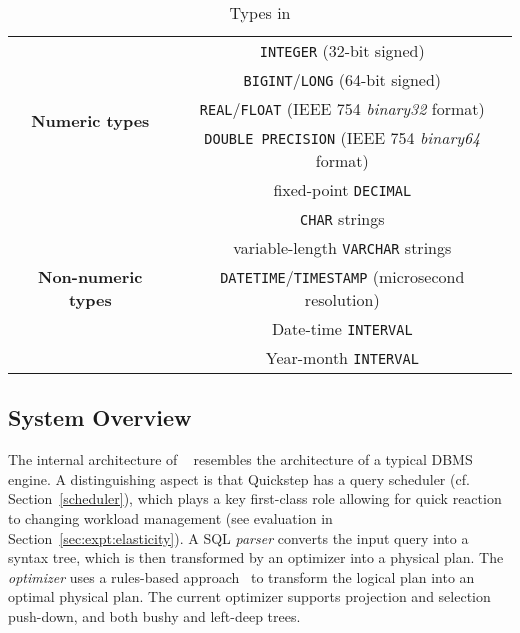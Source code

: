 \begin{table}[t]
	\centering
	\begin{tabular}{|c|c|} \hline
		\multirow{5}{*}{\textbf{Numeric types}} &  \small{\texttt{INTEGER} (32-bit signed)} \\ & \small{\texttt{BIGINT}/\texttt{LONG} (64-bit signed)} \\  & \small{\texttt{REAL}/\texttt{FLOAT} (IEEE 754 \textit{binary32} format)} \\ & \small{\texttt{DOUBLE PRECISION} (IEEE 754 \textit{binary64} format)} \\ & \small{fixed-point \texttt{DECIMAL}} \\ \hline
		\multirow{5}{*}{\textbf{Non-numeric types}} & \texttt{CHAR} strings \\ & variable-length  \texttt{VARCHAR} strings \\ & \texttt{DATETIME}/\texttt{TIMESTAMP} (microsecond resolution) \\ & Date-time \texttt{INTERVAL} \\ & Year-month \texttt{INTERVAL} \\ \hline  
	\end{tabular}
	\caption{Types in \Quickstep}
	\label{table:types}
\end{table}


\subsection{System Overview} \label{overview}
The internal architecture of \Quickstep\ %
resembles the architecture of a typical DBMS engine. A distinguishing aspect is that Quickstep has a query scheduler (cf. Section~\ref{scheduler}), which plays a key first-class role allowing for quick reaction to changing workload management (see evaluation in Section~\ref{sec:expt:elasticity}). A SQL \textit{parser} converts the input query into a syntax tree, which is then transformed by an optimizer into a physical plan. The \textit{optimizer} %
uses a rules-based approach~\cite{Volcano} to transform the logical plan into an optimal physical plan. %
The current optimizer %
supports projection and selection push-down, and both bushy and left-deep trees. 

